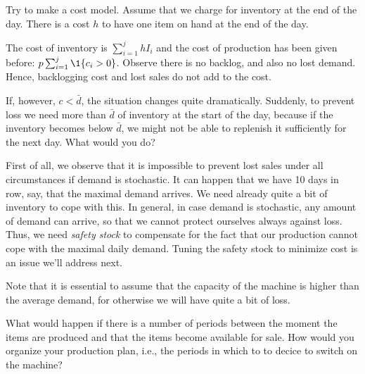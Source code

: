 \begin{question}
  Try to make a cost model. Assume that we charge for inventory at the
  end of the day.  There is a cost $h$ to have one item on hand at the
  end of the day.
\end{question}

  \begin{solution}
    The cost of inventory is $\sum_{i=1}^j h I_{i}$ and the cost of
    production has been given before: $p\sum_{i=1}^j \1{c_i>0}$.
    Observe there is no backlog, and also no lost demand. Hence,
    backlogging cost and lost sales do not add to the cost.
  \end{solution}

\begin{question}
  If, however, $c< \bar d$, the situation changes quite
  dramatically. Suddenly, to prevent loss we need more than $\bar d$
  of inventory at the start of the day, because if the inventory
  becomes below $\bar d$, we might not be able to replenish it
  sufficiently for the next day. What would you do?
\end{question}

  \begin{solution}
    First of all, we observe that it is impossible to prevent lost
    sales under all circumstances if demand is stochastic. It can
    happen that we have 10 days in row, say, that the maximal demand
    arrives. We need already quite a bit of inventory to cope with
    this. In general, in case demand is stochastic, any amount of
    demand can arrive, so that we cannot protect ourselves always
    against loss. Thus, we need \emph{safety stock} to compensate for the fact that
    our production cannot cope with the maximal daily demand. Tuning the safety stock to minimize cost is an issue we'll address
    next. 


    Note that it is essential to assume that the capacity of the machine is higher
    than the average demand, for otherwise we will have quite a bit of
    loss. 



  \end{solution}

\begin{question}[use=false]
  What would happen if there is a number of periods between the moment
  the items are produced and that the items become available for
  sale.  How would you organize your production plan, i.e., the periods in which to to decice to switch on the machine? 
\end{question}


